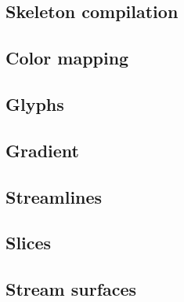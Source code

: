 \subsection{Skeleton compilation}
\subsection{Color mapping}
\subsection{Glyphs}
\subsection{Gradient}
\subsection{Streamlines}
\subsection{Slices}
\subsection{Stream surfaces}